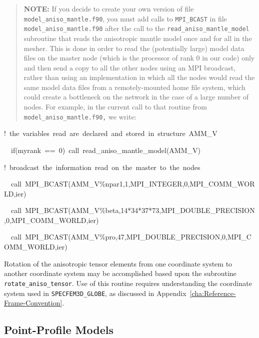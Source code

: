 \documentclass[oneside,english]{book}
\newenvironment{lyxcode}
{\begin{list}{}{
\setlength{\rightmargin}{\leftmargin}
\setlength{\listparindent}{0pt}%
\raggedright
\setlength{\itemsep}{0pt}
\setlength{\parsep}{0pt}
\normalfont\ttfamily}%
 \item[]}
{\end{list}}
\begin{document}
\begin{quote}
\textbf{NOTE:} If you decide to create your own version of file \texttt{model\_aniso\_mantle.f90},
you must add calls to \texttt{MPI\_BCAST} in file \texttt{model\_aniso\_mantle.f90}
after the call to the \texttt{read\_aniso\_mantle\_model} subroutine
that reads the anisotropic mantle model once and for all in the mesher.
This is done in order to read the (potentially large) model data files
on the master node (which is the processor of rank 0 in our code)
only and then send a copy to all the other nodes using an MPI broadcast,
rather than using an implementation in which all the nodes would read
the same model data files from a remotely-mounted home file system,
which could create a bottleneck on the network in the case of a large
number of nodes. For example, in the current call to that routine
from \texttt{model\_aniso\_mantle.f90,} we write:
\end{quote}
\begin{lyxcode}
{\footnotesize !~the~variables~read~are~declared~and~stored~in~structure~AMM\_V}{\footnotesize \par}

{\footnotesize{}~~if(myrank~==~0)~call~read\_aniso\_mantle\_model(AMM\_V)}{\footnotesize \par}

{\footnotesize !~broadcast~the~information~read~on~the~master~to~the~nodes}{\footnotesize \par}

{\footnotesize{}~~call~MPI\_BCAST(AMM\_V\%npar1,1,MPI\_INTEGER,0,MPI\_COMM\_WORLD,ier)~~~~}{\footnotesize \par}

{\footnotesize{}~~call~MPI\_BCAST(AMM\_V\%beta,14{*}34{*}37{*}73,MPI\_DOUBLE\_PRECISION,0,MPI\_COMM\_WORLD,ier)}{\footnotesize \par}

{\footnotesize{}~~call~MPI\_BCAST(AMM\_V\%pro,47,MPI\_DOUBLE\_PRECISION,0,MPI\_COMM\_WORLD,ier)}{\footnotesize \par}
\end{lyxcode}
Rotation of the anisotropic tensor elements from one coordinate system
to another coordinate system may be accomplished based upon the subroutine
\texttt{rotate\_aniso\_tensor}. Use of this routine requires understanding
the coordinate system used in \texttt{SPECFEM3D\_GLOBE}, as discussed
in Appendix~\ref{cha:Reference-Frame-Convention}.


\subsection{{\normalsize \label{sub:Point-Profile-Models}Point-Profile Models}}
\end{document}
